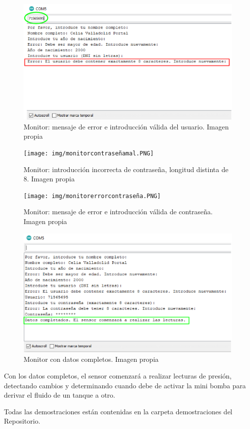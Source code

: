  \begin{figure}[h]
    \centering
    \includegraphics[width=1.1\textwidth]{img/monitorerrorusuario.PNG}
    \caption{Monitor: mensaje de error e introducción válida del usuario. Imagen propia }
    \label{fig:monitorERRORUSUARIO}
\end{figure}

 \begin{figure}[h]
    \centering
    \texttt{[image: img/monitorcontraseñamal.PNG]}
    \caption{Monitor: introducción incorrecta de contraseña, longitud distinta de 8. Imagen propia }
    \label{fig:monitorCONTRASEÑAMAL}
\end{figure}

 \begin{figure}[h]
    \centering
    \texttt{[image: img/monitorerrorcontraseña.PNG]}
    \caption{Monitor: mensaje de error e introducción válida de contraseña. Imagen propia }
    \label{fig:monitorERRORCONTRASEÑA}
\end{figure}

 \begin{figure}[h]
    \centering
    \includegraphics[width=1.1\textwidth]{img/monitorfinalbien.PNG}
    \caption{Monitor con datos completos. Imagen propia }
    \label{fig:monitorFINAL}
\end{figure}
\clearpage
Con los datos completos, el sensor comenzará a realizar lecturas de presión, detectando cambios y determinando cuando debe de activar la mini bomba para derivar el fluido de un tanque a otro.

Todas las demostraciones están contenidas en la carpeta demostraciones del Repositorio.
